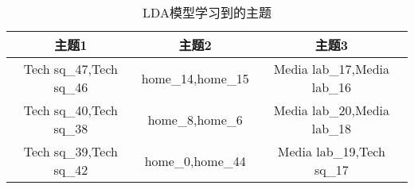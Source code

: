 \begin{table}[htbp]
  \centering
  \caption[LDA模型学习到的主题]{LDA模型学习到的主题}
  \label{tab:ldatopics}
    \begin{tabular}{ccc}%
      \toprule[1.5pt]
      主题1 & 主题2 & 主题3\\
      \midrule[1pt]
      Tech sq\_47,Tech sq\_46 & home\_14,home\_15 & Media lab\_17,Media lab\_16\\
      Tech sq\_40,Tech sq\_38 & home\_8,home\_6 & Media lab\_20,Media lab\_18\\
      Tech sq\_39,Tech sq\_42 & home\_0,home\_44 & Media lab\_19,Tech sq\_17\\
      \bottomrule[1.5pt]
    \end{tabular}
\end{table}
